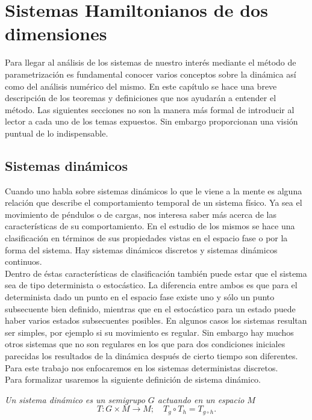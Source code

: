 \chapter{Sistemas Hamiltonianos de dos dimensiones}
Para llegar al análisis de los sistemas de nuestro interés mediante el método de parametrización es fundamental conocer varios conceptos sobre la dinámica así como del análisis numérico del mismo. En este capítulo se hace una breve descripción de los teoremas y definiciones que nos ayudarán a entender el método. Las siguientes secciones no son la manera más formal de introducir al lector a cada uno de los temas expuestos. Sin embargo proporcionan una visión puntual de lo indispensable. 

\section{Sistemas dinámicos}
Cuando uno habla sobre sistemas dinámicos lo que le viene a la mente es alguna relación que describe el comportamiento temporal de un sistema físico. Ya sea el movimiento de péndulos o de cargas, nos interesa saber más acerca de las características de su comportamiento. 
En el estudio de los mismos se hace una clasificación en términos de sus propiedades vistas en el espacio fase o por la forma del sistema. Hay sistemas dinámicos discretos y sistemas dinámicos continuos. \\

 Dentro de éstas características de clasificación también puede estar que el sistema sea de tipo determinista o estocástico. La diferencia entre ambos es que para el determinista dado un punto en el espacio fase existe uno y sólo un punto subsecuente bien definido, mientras que en el estocástico para un estado puede haber varios estados subsecuentes posibles.
En algunos casos los sistemas resultan ser simples, por ejemplo si su movimiento es regular. Sin embargo hay muchos otros sistemas que no son regulares en los que para dos condiciones iniciales parecidas los resultados de la dinámica después de cierto tiempo son diferentes. Para este trabajo nos enfocaremos en los  sistemas deterministas discretos.\\

Para formalizar usaremos la siguiente definición de sistema dinámico.  \\
\begin{defini}
\textit{Un sistema dinámico es un semigrupo $G$ actuando en un espacio $M$}
\begin{equation}
T : G \times M \rightarrow M; \quad
T_{g}\circ T_{h}=T_{g\circ h} . \label{def sistema dinamico}
\end{equation}
\end{defini}


